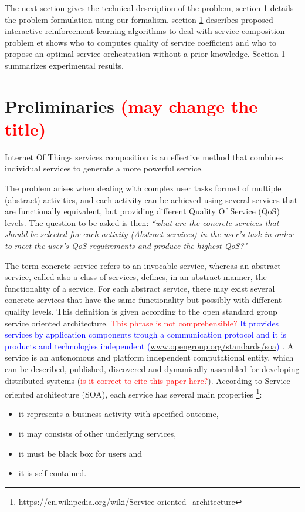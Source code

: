 \documentclass[10pt,journal,compsoc]{IEEEtran}
\newcommand{\red}[1]{\textcolor{red}{#1}}
\newcommand{\blue}[1]{\textcolor{blue}{#1}}
\begin{document}
The next section gives the technical description of the problem, section \ref{} details the problem formulation using our formalism. section \ref{} describes proposed interactive reinforcement learning algorithms to deal with service composition problem et shows who to computes  quality of service coefficient and who to propose an optimal service orchestration without a prior knowledge. Section \ref{} summarizes experimental results.  

\section{Preliminaries \red{(may change the title)}}
Internet Of Things  services composition is an effective method that combines individual services to generate a more powerful service. 

The problem arises when dealing with complex user tasks formed of multiple (abstract) activities, and each activity can be achieved using several services that are functionally equivalent, but providing different Quality Of Service (QoS) levels. The question to be asked is then:  \emph{``what are the concrete services that should be selected for each activity (Abstract services) in the user's task in order to meet the user's QoS requirements and produce the highest QoS?"}

The term concrete service refers to an invocable service, whereas an abstract service, called also a class of services, defines, in an abstract manner, the functionality of a service. For each abstract service, there may exist several concrete services that have the same functionality but possibly with different quality levels.  This definition is given according to the open standard group service oriented architecture. \red{This phrase is not comprehensible?} \blue{It provides services by application components trough a communication protocol and it is products and technologies independent (\url{www.opengroup.org/standards/soa}) }. A service is an autonomous and platform independent computational entity, which can be described, published, discovered and dynamically assembled for developing distributed systems \cite{ARASI2017} (\red{is it correct to cite this paper here?}). According to Service-oriented architecture (SOA), each service has several main properties \footnote{\url{https://en.wikipedia.org/wiki/Service-oriented_architecture}}: 
\begin{itemize}
\item it represents a business activity with specified outcome,
\item it may consists of other underlying services,
\item it must be black box for users and
\item it is self-contained.
\end{itemize}
\end{document}
